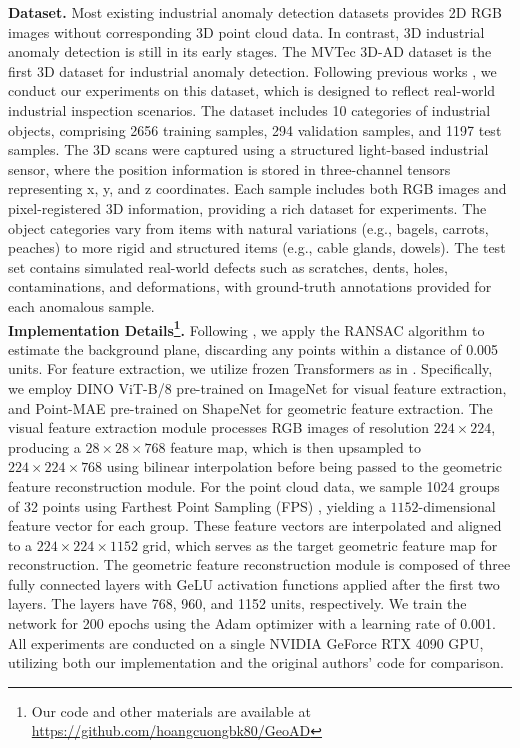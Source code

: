 \textbf{Dataset.}  Most existing industrial anomaly detection datasets provides 2D RGB images without corresponding 3D point cloud data. In contrast, 3D industrial anomaly detection is still in its early stages. The MVTec 3D-AD dataset \cite{bergmann2022mvtec} is the first 3D dataset for industrial anomaly detection. Following previous works \cite{wang2023multimodal}, we conduct our experiments on this dataset, which is designed to reflect real-world industrial inspection scenarios. The dataset includes 10 categories of industrial objects, comprising 2656 training samples, 294 validation samples, and 1197 test samples. The 3D scans were captured using a structured light-based industrial sensor, where the position information is stored in three-channel tensors representing x, y, and z coordinates. Each sample includes both RGB images and pixel-registered 3D information, providing a rich dataset for experiments. The object categories vary from items with natural variations (e.g., bagels, carrots, peaches) to more rigid and structured items (e.g., cable glands, dowels). The test set contains simulated real-world defects such as scratches, dents, holes, contaminations, and deformations, with ground-truth annotations provided for each anomalous sample. \\

\noindent \textbf{Implementation Details\footnote{Our code and other materials are available at \url{https://github.com/hoangcuongbk80/GeoAD}}.} Following \cite{wang2023multimodal}, we apply the RANSAC algorithm \cite{fischler1981random} to estimate the background plane, discarding any points within a distance of 0.005 units. For feature extraction, we utilize frozen Transformers as in \cite{wang2023multimodal}. Specifically, we employ DINO ViT-B/8 \cite{dosovitskiy2020image} pre-trained on ImageNet \cite{deng2009imagenet} for visual feature extraction, and Point-MAE \cite{pang2022masked} pre-trained on ShapeNet \cite{chang2015shapenet} for geometric feature extraction. The visual feature extraction module processes RGB images of resolution $224 \times 224$, producing a $28 \times 28 \times 768$ feature map, which is then upsampled to $224 \times 224 \times 768$ using bilinear interpolation before being passed to the geometric feature reconstruction module. For the point cloud data, we sample 1024 groups of 32 points using Farthest Point Sampling (FPS) \cite{qi2017pointnet++}, yielding a $1152$-dimensional feature vector for each group. These feature vectors are interpolated and aligned to a $224 \times 224 \times 1152$ grid, which serves as the target geometric feature map for reconstruction. The geometric feature reconstruction module is composed of three fully connected layers with GeLU activation functions applied after the first two layers. The layers have 768, 960, and 1152 units, respectively. We train the network for 200 epochs using the Adam optimizer \cite{kingma2014adam} with a learning rate of 0.001. All experiments are conducted on a single NVIDIA GeForce RTX 4090 GPU, utilizing both our implementation and the original authors' code for comparison. \\

